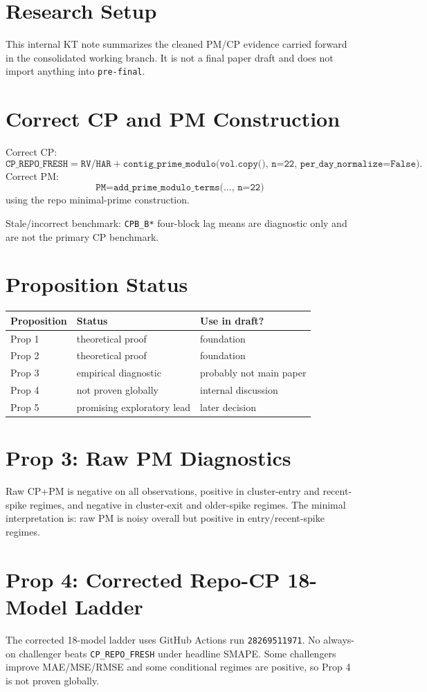 \section{Research Setup}
This internal KT note summarizes the cleaned PM/CP evidence carried forward in the consolidated working branch. It is not a final paper draft and does not import anything into \texttt{pre-final}.

\section{Correct CP and PM Construction}
Correct CP:
\[
\texttt{CP\_REPO\_FRESH} = \texttt{RV/HAR} + \texttt{contig\_prime\_modulo(vol.copy(), n=22, per\_day\_normalize=False)}.
\]
Correct PM:
\[
\texttt{PM} = \texttt{add\_prime\_modulo\_terms(..., n=22)}
\]
using the repo minimal-prime construction.

Stale/incorrect benchmark: \texttt{CPB\_B*} four-block lag means are diagnostic only and are not the primary CP benchmark.

\section{Proposition Status}
\begin{tabular}{lll}
\hline
Proposition & Status & Use in draft? \\
\hline
Prop 1 & theoretical proof & foundation \\
Prop 2 & theoretical proof & foundation \\
Prop 3 & empirical diagnostic & probably not main paper \\
Prop 4 & not proven globally & internal discussion \\
Prop 5 & promising exploratory lead & later decision \\
\hline
\end{tabular}

\section{Prop 3: Raw PM Diagnostics}
Raw CP+PM is negative on all observations, positive in cluster-entry and recent-spike regimes, and negative in cluster-exit and older-spike regimes. The minimal interpretation is: raw PM is noisy overall but positive in entry/recent-spike regimes.

\section{Prop 4: Corrected Repo-CP 18-Model Ladder}
The corrected 18-model ladder uses GitHub Actions run \texttt{28269511971}. No always-on challenger beats \texttt{CP\_REPO\_FRESH} under headline SMAPE. Some challengers improve MAE/MSE/RMSE and some conditional regimes are positive, so Prop 4 is not proven globally.

